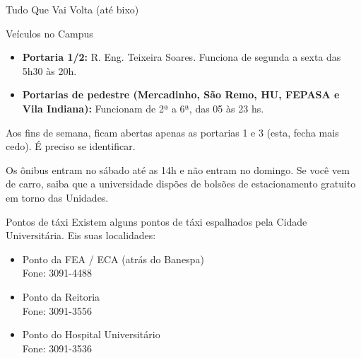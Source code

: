 \begin{secao}{Tudo Que Vai Volta (até bixo)}
\begin{subsecao}{Veículos no Campus}
\begin{itemize}
  \item {\bf Portaria 1/2:} R. Eng. Teixeira Soares. Funciona de segunda a sexta das 5h30 às 20h. 
    
  \item {\bf Portarias de pedestre (Mercadinho, São Remo, HU, FEPASA e
      Vila Indiana):} Funcionam de 2ª a 6ª, das 05 às 23 hs.

\end{itemize}

Aos fins de semana, ficam abertas apenas as portarias 1 e 3 (esta, fecha mais cedo). É preciso se identificar.

Os ônibus entram no sábado até as 14h e não entram no domingo. Se você vem de carro, saiba que a universidade dispões de bolsões de estacionamento
gratuito em torno das Unidades.

\end{subsecao}

\begin{subsecao}{Pontos de táxi}
Existem alguns pontos de táxi espalhados pela Cidade Universitária. Eis suas
localidades:

\begin{itemize}
\item Ponto da FEA / ECA (atrás do Banespa)\\
Fone: 3091-4488

\item Ponto da Reitoria\\
Fone: 3091-3556

\item Ponto do Hospital Universitário\\
Fone: 3091-3536
\end{itemize}
\end{subsecao}


\end{secao}

